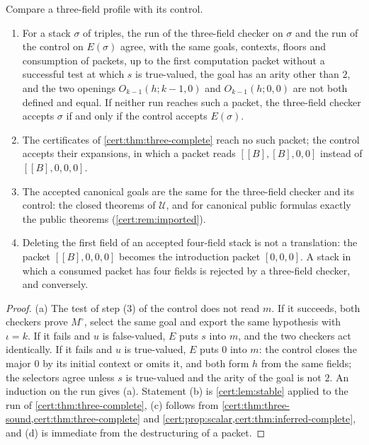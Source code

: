 \begin{proposition}\label{cert:prop:three-relation}
Compare a three-field profile with its control.
\begin{enumerate}[label=(\alph*)]
\item For a stack $\sigma$ of triples, the run of the three-field checker on
$\sigma$ and the run of the control on $E(\sigma)$ agree, with the same goals,
contexts, floors and consumption of packets, up to the first computation
packet without a successful test at which $s$ is true-valued, the goal has an
arity other than $2$, and the two openings $O_{k-1}(h;k-1,0)$ and
$O_{k-1}(h;0,0)$ are not both defined and equal. If neither run reaches such
a packet, the three-field checker accepts $\sigma$ if and only if the control
accepts $E(\sigma)$.
\item The certificates of \cref{cert:thm:three-complete} reach no such packet;
the control accepts their expansions, in which a  packet reads
$[[B],[B],0,0]$ instead of $[[B],0,0,0]$.
\item The accepted canonical goals are the same for the three-field checker
and its control: the closed theorems of $\mathcal U$, and for canonical public
formulas exactly the public theorems (\cref{cert:rem:imported}).
\item Deleting the first field of an accepted four-field stack is not a
translation: the  packet $[[B],0,0,0]$ becomes the introduction
packet $[0,0,0]$. A stack in which a consumed packet has four fields is
rejected by a three-field checker, and conversely.
\end{enumerate}
\end{proposition}
\begin{proof}
(a) The test of step (3) of the control does not read $m$. If it succeeds, both
checkers prove $M^{\circ}$, select the same goal and export the same
hypothesis with $\iota=k$. If it fails and $u$ is false-valued, $E$ puts $s$
into $m$, and the two checkers act identically. If it fails and $u$ is
true-valued, $E$ puts $0$ into $m$: the control closes the major $0$ by its
initial context or omits it, and both form $h$ from the same fields; the
selectors agree unless $s$ is true-valued and the arity of the goal is not
$2$. An induction on the run gives (a). Statement (b) is
\cref{cert:lem:stable} applied to the run of \cref{cert:thm:three-complete},
(c) follows from \cref{cert:thm:three-sound,cert:thm:three-complete} and
\cref{cert:prop:scalar,cert:thm:inferred-complete}, and (d) is immediate from
the destructuring of a packet.
\end{proof}

